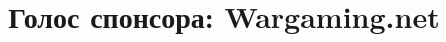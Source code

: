 \documentclass[10pt, a5paper]{article}
\begin{document}
\title{Голос спонсора: Wargaming.net}
\date{}
\maketitle

~
\end{document}
